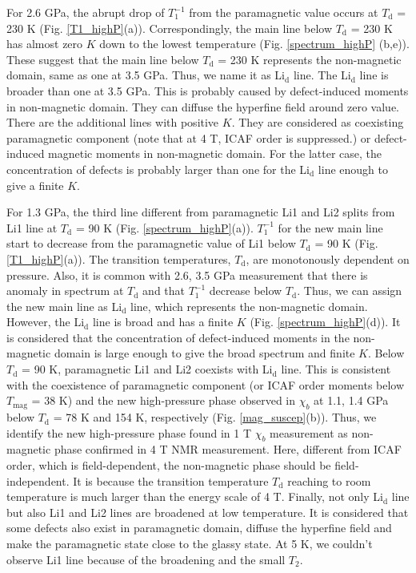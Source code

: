 \documentclass[a4,10.5pt]{report}
\begin{document}
For 2.6 GPa, the abrupt drop of $T^{-1}_1$ from the paramagnetic value occurs at $T_{\mathrm{d}}$ = 230 K (Fig. \ref{T1_highP}(a)). 
Correspondingly, the main line below $T_{\mathrm{d}}$ = 230 K has almost zero $K$ down to the lowest temperature (Fig. \ref{spectrum_highP} (b,e)). 
These suggest that the main line below $T_{\mathrm{d}}$ = 230 K represents the non-magnetic domain, same as one at 3.5 GPa. 
Thus, we name it as Li$_\mathrm{d}$ line. 
The Li$_\mathrm{d}$ line is broader than one at 3.5 GPa. 
This is probably caused by defect-induced moments in non-magnetic domain. 
They can diffuse the hyperfine field around zero value. 
There are the additional lines with positive $K$. 
They are considered as coexisting paramagnetic component (note that at 4 T, ICAF order is suppressed.) or defect-induced magnetic moments in non-magnetic domain. 
For the latter case, the concentration of defects is probably larger than one for the Li$_\mathrm{d}$ line enough to give a finite $K$.

For 1.3 GPa, the third line different from paramagnetic Li1 and Li2 splits from Li1 line at $T_{\mathrm{d}}$ = 90 K (Fig. \ref{spectrum_highP}(a)). 
$T^{-1}_1$ for the new main line start to decrease from the paramagnetic value of Li1 below $T_{\mathrm{d}}$ = 90 K (Fig. \ref{T1_highP}(a)). 
The transition temperatures, $T_{\mathrm{d}}$, are monotonously dependent on pressure. 
Also, it is common with 2.6, 3.5 GPa measurement that there is anomaly in spectrum at $T_{\mathrm{d}}$ and that $T^{-1}_1$ decrease below $T_{\mathrm{d}}$. 
Thus, we can assign the new main line as Li$_\mathrm{d}$ line, which represents the non-magnetic domain. 
However, the Li$_\mathrm{d}$ line is broad and has a finite $K$ (Fig. \ref{spectrum_highP}(d)). 
It is considered that the concentration of defect-induced moments in the non-magnetic domain is large enough to give the broad spectrum and finite $K$. 
Below $T_{\mathrm{d}}$ = 90 K, paramagnetic Li1 and Li2 coexists with Li$_\mathrm{d}$ line. 
This is consistent with the coexistence of paramagnetic component (or ICAF order moments below $T_\mathrm{mag}$ = 38 K) 
and the new high-pressure phase observed in $\chi_b$ at 1.1, 1.4 GPa below $T_{\mathrm{d}}$ = 78 K and 154 K, respectively (Fig. \ref{mag_suscep}(b)). 
Thus, we identify the new high-pressure phase found in 1 T $\chi_b$ measurement as non-magnetic phase confirmed in 4 T NMR measurement. 
Here, different from ICAF order, which is field-dependent, the non-magnetic phase should be field-independent. 
It is because the transition temperature $T_{\mathrm{d}}$ reaching to room temperature is much larger than the energy scale of 4 T. 
Finally, not only Li$_\mathrm{d}$ line but also Li1 and Li2 lines are broadened at low temperature. 
It is considered that some defects also exist in paramagnetic domain, diffuse the hyperfine field and make the paramagnetic state close to the glassy state. 
At 5 K, we couldn't observe Li1 line because of the broadening and the small $T_2$.
\end{document}

